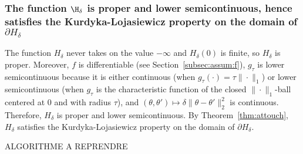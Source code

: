 \subsubsection{The  function  $\H_{\delta}$  is proper  and  lower
  semicontinuous,  hence satisfies  the  Kurdyka-Lojasiewicz  property on  the
  domain of $\partial H_{\delta}$}

The   function  $H_{\delta}$   never  takes   on  the   value  $-\infty$   and
$H_{\delta}(0)$  is  finite, so  $H_{\delta}$  is  proper.  Moreover,  $f$  is
differentiable   (see  Section~\ref{subsec:assum:f}),   $g_{\tau}$  is   lower
semicontinuous     because      it     is     either      continuous     (when
$g_{\tau}  (\cdot)  =  \tau  \|\cdot\|_{1}$)  or  lower  semicontinuous  (when
$g_{\tau}$ is  the characteristic function of  the closed $\|\cdot\|_{1}$-ball
centered      at      0      and       with      radius      $\tau$),      and
$(\theta,\theta') \mapsto  \delta\|\theta - \theta'\|_{2}^{2}$  is continuous.
Therefore,   $H_{\delta}$   is   proper    and   lower   semicontinuous.    By
Theorem~\ref{thm:attouch},  $H_{\delta}$   satisfies  the  Kurdyka-Lojasiewicz
property on the domain of $\partial H_{\delta}$.


\begin{center}
  ALGORITHME A REPRENDRE
\end{center}

